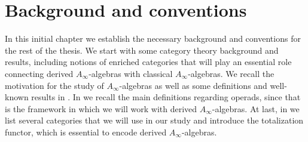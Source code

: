 \documentclass[Thesis.tex]{subfiles}
\begin{document}
\doublespacing
\sloppy
\chapter{Background and conventions}\label{Sec1}

In this initial chapter we establish the necessary background and conventions for the rest of the thesis. We start  with some category theory background and results, including notions of enriched categories that will play an essential role connecting derived $A_\infty$-algebras with classical $A_\infty$-algebras. We recall the motivation  for the study of $A_\infty$-algebras as well as some definitions and well-known results in . In  we recall the main definitions regarding operads, since that is the framework in which we will work with derived $A_\infty$-algebras. At last, in  we list several categories that we will use in our study and introduce the totalization functor, which is essential to encode derived $A_\infty$-algebras.



\end{document}
